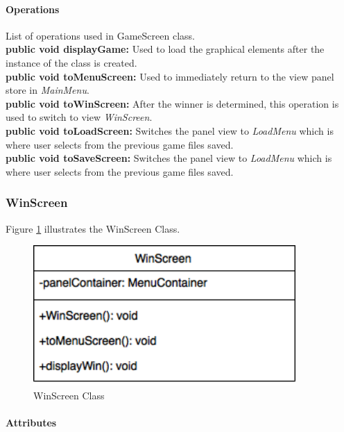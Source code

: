 \documentclass[12pt]{article} %
\begin{document}
\paragraph{Operations \\}
List of operations used in GameScreen class.\\
\textbf{public void displayGame:} Used to load the graphical elements after the instance of the class is created.\\
\textbf{public void toMenuScreen:} Used to immediately return to the view panel store in \textit{MainMenu}. \\
\textbf{public void toWinScreen:} After the winner is determined, this operation is used to switch to view \textit{WinScreen}. \\
\textbf{public void toLoadScreen:} Switches the panel view to \textit{LoadMenu} which is where user selects from the previous game files saved.\\
\textbf{public void toSaveScreen:} Switches the panel view to \textit{LoadMenu} which is where user selects from the previous game files saved.\\



\subsubsection{WinScreen} %

Figure \ref{fig:winscreen} illustrates the WinScreen Class.
\begin{figure}[h!]
   \centering
   \vspace{10pt}%
   \includegraphics[width=10cm]{winscreen.png}
   \caption{WinScreen Class}
   \label{fig:winscreen}
\end{figure}

\paragraph{Attributes \\}
\end{document}
